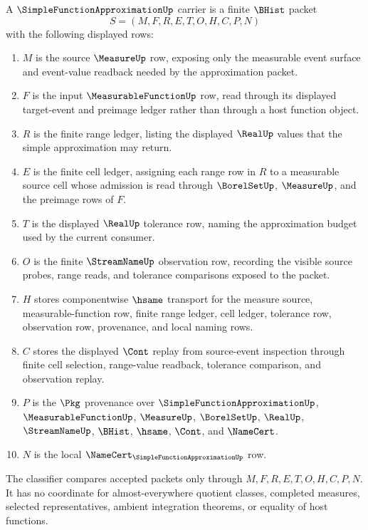\begin{definition}
\label{def:simple-function-approximation-carrier}
A $\SimpleFunctionApproximationUp$ carrier is a finite $\BHist$ packet
$$
S=(M,F,R,E,T,O,H,C,P,N)
$$
with the following displayed rows:
\begin{enumerate}
\item $M$ is the source $\MeasureUp$ row, exposing only the measurable event surface and event-value readback needed by the approximation packet.
\item $F$ is the input $\MeasurableFunctionUp$ row, read through its displayed target-event and preimage ledger rather than through a host function object.
\item $R$ is the finite range ledger, listing the displayed $\RealUp$ values that the simple approximation may return.
\item $E$ is the finite cell ledger, assigning each range row in $R$ to a measurable source cell whose admission is read through $\BorelSetUp$, $\MeasureUp$, and the preimage rows of $F$.
\item $T$ is the displayed $\RealUp$ tolerance row, naming the approximation budget used by the current consumer.
\item $O$ is the finite $\StreamNameUp$ observation row, recording the visible source probes, range reads, and tolerance comparisons exposed to the packet.
\item $H$ stores componentwise $\hsame$ transport for the measure source, measurable-function row, finite range ledger, cell ledger, tolerance row, observation row, provenance, and local naming rows.
\item $C$ stores the displayed $\Cont$ replay from source-event inspection through finite cell selection, range-value readback, tolerance comparison, and observation replay.
\item $P$ is the $\Pkg$ provenance over $\SimpleFunctionApproximationUp$, $\MeasurableFunctionUp$, $\MeasureUp$, $\BorelSetUp$, $\RealUp$, $\StreamNameUp$, $\BHist$, $\hsame$, $\Cont$, and $\NameCert$.
\item $N$ is the local $\NameCert_{\SimpleFunctionApproximationUp}$ row.
\end{enumerate}
The classifier compares accepted packets only through $M,F,R,E,T,O,H,C,P,N$. It has no coordinate for almost-everywhere quotient classes, completed measures, selected representatives, ambient integration theorems, or equality of host functions.
\end{definition}

